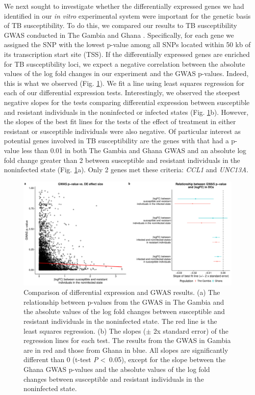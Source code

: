 \documentclass[fleqn,10pt]{wlscirep}
\begin{document}
We next sought to investigate whether the differentially expressed
genes we had identified in our \emph{in vitro} experimental system
were important for the genetic basis of TB susceptibility. To do this,
we compared our results to TB susceptibility GWAS conducted in The
Gambia and Ghana \cite{Thye2010}. Specifically, for each gene we
assigned the SNP with the lowest p-value among all SNPs located within
50 kb of its transcription start site (TSS). If the differentially
expressed genes are enriched for TB susceptibility loci, we expect a
negative correlation between the absolute values of the log fold
changes in our experiment and the GWAS p-values. Indeed, this is what
we observed (Fig. \ref{fig:gwas}). We fit a line using least squares
regression for each of our differential expression tests.
Interestingly, we observed the steepest negative slopes for the tests
comparing differential expression between susceptible and resistant
individuals in the noninfected or infected states (Fig.
\ref{fig:gwas}b). However, the slopes of the best fit lines for the
tests of the effect of treatment in either resistant or susceptible
individuals were also negative. Of particular interest as potential
genes involved in TB susceptibility are the genes with that had a
p-value less than 0.01 in both The Gambia and Ghana GWAS and an
absolute log fold change greater than 2 between susceptible and
resistant individuals in the noninfected state (Fig. \ref{fig:gwas}a).
Only 2 genes met these criteria: \emph{CCL1} and \emph{UNC13A}.

\begin{figure}[ht]
\centering
\includegraphics[width=\linewidth]{../figure/gwas.pdf}
\caption{
Comparison of differential expression and GWAS results. (a) The
relationship between p-values from the GWAS in The Gambia
\cite{Thye2010} and the absolute values of the log fold changes
between susceptible and resistant individuals in the noninfected
state. The red line is the least squares regression. (b) The slopes
($\pm$ 2x standard error) of the regression lines for each test. The
results from the GWAS in Gambia are in red and those from Ghana in
blue. All slopes are significantly different than 0 (t-test \emph{P}
\textless \, 0.05), except for the slope between the Ghana GWAS
p-values and the absolute values of the log fold changes between
susceptible and resistant individuals in the noninfected state.
}
\label{fig:gwas}
\end{figure}
\end{document}
